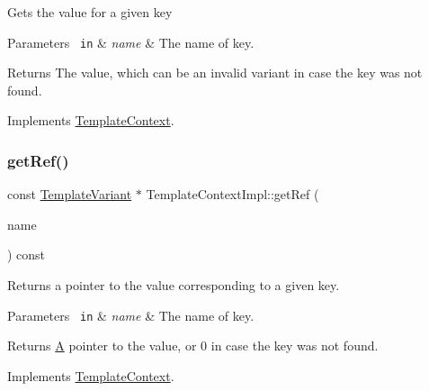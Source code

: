 Gets the value for a given key 
\begin{DoxyParams}[1]{Parameters}
\mbox{\texttt{ in}}  & {\em name} & The name of key. \\
\hline
\end{DoxyParams}
\begin{DoxyReturn}{Returns}
The value, which can be an invalid variant in case the key was not found. 
\end{DoxyReturn}


Implements \mbox{\hyperlink{class_template_context_a6d65a9047de8ec4363612e576031e781}{Template\+Context}}.

\mbox{\label{class_template_context_impl_aba8ebc4a96d6a1a52f0f16d00a658770}} 
\subsubsection{\texorpdfstring{getRef()}{getRef()}}
{\footnotesize\ttfamily const \mbox{\hyperlink{class_template_variant}{Template\+Variant}} $\ast$ Template\+Context\+Impl\+::get\+Ref (\begin{DoxyParamCaption}\item[{const \mbox{\hyperlink{class_q_c_string}{Q\+C\+String}} \&}]{name }\end{DoxyParamCaption}) const\hspace{0.3cm}{\ttfamily [virtual]}}

Returns a pointer to the value corresponding to a given key. 
\begin{DoxyParams}[1]{Parameters}
\mbox{\texttt{ in}}  & {\em name} & The name of key. \\
\hline
\end{DoxyParams}
\begin{DoxyReturn}{Returns}
\mbox{\hyperlink{class_a}{A}} pointer to the value, or 0 in case the key was not found. 
\end{DoxyReturn}


Implements \mbox{\hyperlink{class_template_context_ac73a3e85149ff072aea9e3ab091c4ed1}{Template\+Context}}.

\mbox{\label{class_template_context_impl_af8856e3207a53fad3f700353d71b575e}} 
